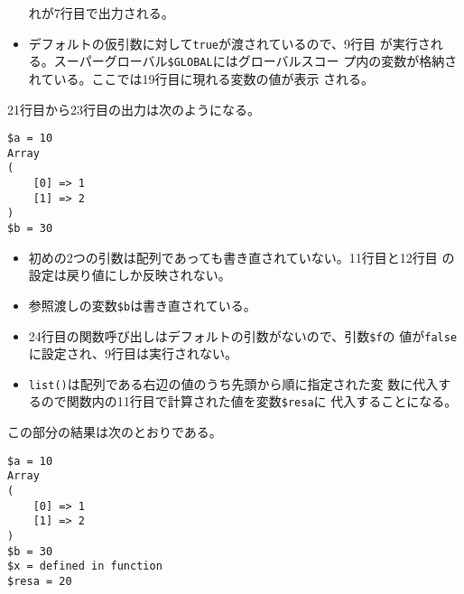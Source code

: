\begin{Exec}
\begin{itemize}
       れが7行目で出力される。
 \item デフォルトの仮引数に対して\texttt{true}が渡されているので、9行目
       が実行される。スーパーグローバル\Verb+$GLOBAL+にはグローバルスコー
       プ内の変数が格納されている。ここでは19行目に現れる変数の値が表示
       される。
\end{itemize}
21行目から23行目の出力は次のようになる。
\begin{Verbatim}
$a = 10
Array
(
    [0] => 1
    [1] => 2
)
$b = 30
\end{Verbatim}
\begin{itemize}
 \item 初めの2つの引数は配列であっても書き直されていない。11行目と12行目
       の設定は戻り値にしか反映されない。
 \item 参照渡しの変数\Verb+$b+は書き直されている。
\end{itemize}
 \iffalse
 \begin{listingcont}
list($resa) = example($a, $as, $b);
print "\$resa = $resa\n";
?>
 \end{listingcont}
 \fi
 \begin{itemize}
 \item 24行目の関数呼び出しはデフォルトの引数がないので、引数\Verb+$f+の
       値が\texttt{false}に設定され、9行目は実行されない。
 \item \texttt{list()}は配列である右辺の値のうち先頭から順に指定された変
       数に代入するので関数内の11行目で計算された値を変数\Verb+$resa+に
       代入することになる。
 \end{itemize}
この部分の結果は次のとおりである。
\begin{Verbatim}
$a = 10
Array
(
    [0] => 1
    [1] => 2
)
$b = 30
$x = defined in function
$resa = 20
\end{Verbatim}
\end{Exec}
